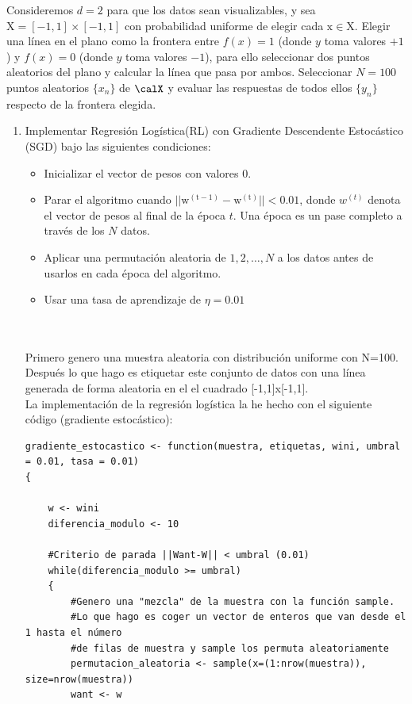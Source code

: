 	 Consideremos $d=2$ para que los datos sean visualizables, y sea $\mathrm{X=[-1,1]\times[-1,1]}$ con probabilidad uniforme de elegir cada $\mathrm{x \in X}$.  Elegir una línea en el plano como la frontera entre $f(x)=1$ (donde $y$ toma valores $+1$) y $f(x)=0$ (donde $y$ toma valores $-1$), para ello seleccionar dos puntos aleatorios del plano y calcular la línea que pasa por ambos. Seleccionar $N=100$ puntos aleatorios $\{x_n\}$ de $\calX$ y evaluar las respuestas de todos ellos $\{y_n\}$ respecto de la frontera elegida.
	 \begin{enumerate}
	 	\item Implementar Regresión Logística(RL) con Gradiente Descendente Estocástico (SGD) bajo las siguientes condiciones:
	 	\begin{itemize}
	 		\item Inicializar el vector de pesos con valores 0.
	 		\item Parar el algoritmo cuando $\mathrm{||w^{(t-1)}-w^{(t)}||<0.01}$, donde $w^{(t)}$ denota el vector de pesos al final de la época $t$. Una época es un pase completo a través de los $N$ datos. 
	 		\item Aplicar una permutación aleatoria de $1,2,\dots,N$ a los datos antes de usarlos en cada época  del algoritmo.
	 		\item Usar una tasa de aprendizaje de $\eta=0.01$
	 	\end{itemize}
	 	\\
	 	\\
	 	
	 	Primero genero una muestra aleatoria con distribución uniforme con N=100. Después lo que hago es etiquetar este conjunto de datos con una línea generada de forma aleatoria en el el cuadrado [-1,1]x[-1,1].
	 	\\
	 	
	 	La implementación de la regresión logística la he hecho con el siguiente código (gradiente estocástico):
	 	\newpage
	 	
	 	\begin{lstlisting}
gradiente_estocastico <- function(muestra, etiquetas, wini, umbral = 0.01, tasa = 0.01)
{

	w <- wini
	diferencia_modulo <- 10
	
	#Criterio de parada ||Want-W|| < umbral (0.01)
	while(diferencia_modulo >= umbral)
	{
		#Genero una "mezcla" de la muestra con la función sample.
		#Lo que hago es coger un vector de enteros que van desde el 1 hasta el número
		#de filas de muestra y sample los permuta aleatoriamente
		permutacion_aleatoria <- sample(x=(1:nrow(muestra)), size=nrow(muestra))
		want <- w
		

\end{lstlisting}
\end{enumerate}
